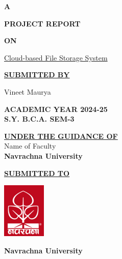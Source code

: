 \documentclass[a4paper]{report}
\begin{document}
\afterpage{\restorepagecolor}
\begin{titlepage}
    \onehalfspacing
    \setlength{\baselineskip}{18pt}
    \color{white}
    \begin{center}
        \textbf{\LARGE{A\\ }}

        \textbf{\LARGE{PROJECT REPORT}}

        \textbf{\LARGE{ON}}

        \Large{\underline{Cloud-based File Storage System}}
        \vspace{1cm}

        \textbf{\underline{SUBMITTED BY}}

        Vineet Maurya
        \vspace{1cm}

        \textbf{ACADEMIC YEAR 2024-25\\
            S.Y. B.C.A. SEM-3}
        \vspace{1cm}

        \textbf{\underline{UNDER THE GUIDANCE OF}}\\
        Name of Faculty\\
        \textbf{Navrachna University}
        \vspace{1cm}

        \textbf{\underline{SUBMITTED TO}}
        \vspace{0.5cm}

        \includegraphics{nuv_logo.png}
        \vspace{0.5cm}

        \textbf{Navrachna University}
    \end{center}
\end{titlepage}
\newpage
\onehalfspacing
\setlength{\baselineskip}{18pt}
\color{black}
\end{document}
